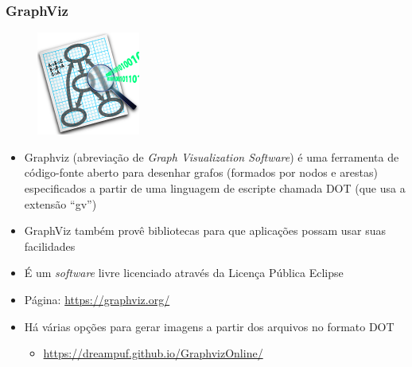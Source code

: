 \documentclass[aspectratio=169]{beamer}
\begin{document}
\begin{frame}\frametitle{GraphViz}
\vspace{-2mm}
\begin{figure}[h]
	\centering
	\includegraphics[height=0.25\paperheight]{imagens/graphviz.png}
\end{figure}
\vspace{-3mm}
\begin{itemize}
	\item Graphviz (abreviação de \emph{Graph Visualization Software}) é uma ferramenta de código-fonte aberto para desenhar grafos (formados por nodos e arestas) especificados a partir de uma linguagem de escripte chamada DOT (que usa a extensão ``gv'')
	\item GraphViz também provê bibliotecas para que aplicações possam usar suas facilidades
	\item É um \emph{software} livre licenciado através da Licença Pública Eclipse
	\item Página: \url{https://graphviz.org/}
	\item Há várias opções para gerar imagens a partir dos arquivos no formato DOT
	\begin{itemize}
		\item \url{https://dreampuf.github.io/GraphvizOnline/}
	\end{itemize}
\end{itemize}
\end{frame}
\end{document}
